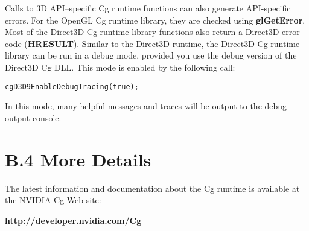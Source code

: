 \documentclass[../main.tex]{subfiles}
\begin{document}
Calls to 3D API–specific Cg runtime functions can also generate API-specific errors. For the OpenGL Cg runtime library, they are checked using \textbf{glGetError}. Most of the Direct3D Cg runtime library functions also return a Direct3D error code (\textbf{HRESULT}). Similar to the Direct3D runtime, the Direct3D Cg runtime library can be run in a debug mode, provided you use the debug version of the Direct3D Cg DLL. This mode is enabled by the following call:

\FloatBarrier
\begin{lstlisting}
cgD3D9EnableDebugTracing(true);
\end{lstlisting}
\FloatBarrier

In this mode, many helpful messages and traces will be output to the debug output console.

\section{B.4 More Details}

The latest information and documentation about the Cg runtime is available at the NVIDIA Cg Web site:

\textbf{http://developer.nvidia.com/Cg}
\end{document}
